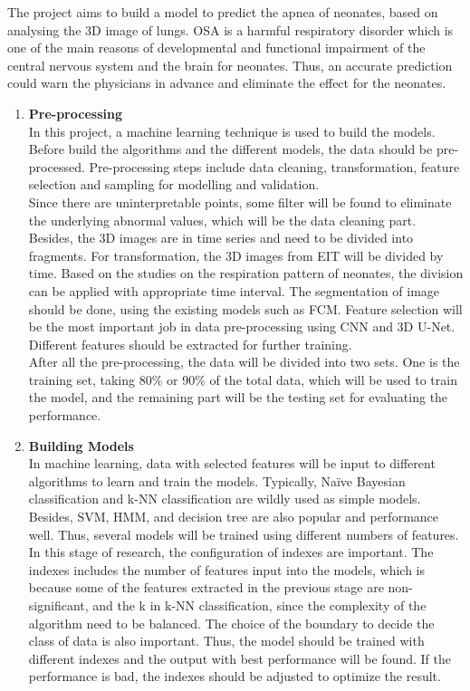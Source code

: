\documentclass[ a4paper, 12pt, oneside ]{article} %
\begin{document}
The project aims to build a model to predict the apnea of neonates, based on analysing the 3D image of lungs. OSA is a harmful respiratory disorder which is one of the main reasons of developmental and functional impairment of the central nervous system and the brain for neonates. Thus, an accurate prediction could warn the physicians in advance and eliminate the effect for the neonates.
\begin{enumerate}
\item \textbf{Pre-processing}\\
In this project, a machine learning technique is used to build the models. Before build the algorithms and the different models, the data should be pre-processed. Pre-processing steps include data cleaning, transformation, feature selection and sampling for modelling and validation.\\
Since there are uninterpretable points, some filter will be found to eliminate the underlying abnormal values, which will be the data cleaning part. Besides, the 3D images are in time series and need to be divided into fragments. For transformation, the 3D images from EIT will be divided  by time. Based on the studies on the respiration pattern of neonates, the division can be applied with appropriate time interval. The segmentation of image should be done, using the existing models such as FCM. Feature selection will be the most important job in data pre-processing using CNN and 3D U-Net. Different features should be extracted for further training.\\
After all the pre-processing, the data will be divided into two sets. One is the training set, taking 80\% or 90\% of the total data, which will be used to train the model, and the remaining part will be the testing set for evaluating the performance. \\
\item \textbf{Building Models}\\
In machine learning, data with selected features will be input to different algorithms to learn and train the models. Typically, Naïve Bayesian classification and k-NN classification are wildly used as simple models. Besides, SVM, HMM, and decision tree are also popular and performance well. Thus, several models will be trained using different numbers of features.\\
In this stage of research, the configuration of indexes are important. The indexes includes the number of features input into the models, which is because some of the features extracted in the previous stage are non-significant, and the k in k-NN classification, since the complexity of the algorithm need to be balanced. The choice of the boundary to decide the class of data is also important. Thus, the model should be trained with different indexes and the output with best performance will be found. If the performance is bad, the indexes should be adjusted to optimize the result.\\

\end{enumerate}
\end{document}
